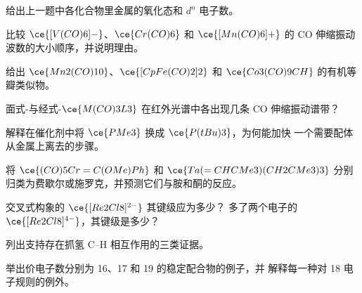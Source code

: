 \begin{exercise}[$\star$]\label{exo:b3:organometallic-bonding:2}
给出上一题中各化合物里金属的氧化态和
$d^n$ 电子数。
\end{exercise}

\begin{exercise}[$\star$]\label{exo:b3:organometallic-bonding:3}
比较 $\ce{[V(CO)6]-}$、$\ce{Cr(CO)6}$ 和 $\ce{[Mn(CO)6]+}$ 的 CO 伸缩振动波数的大小顺序，并说明理由。
\end{exercise}

\begin{exercise}[$\star$]\label{exo:b3:organometallic-bonding:4}
给出 $\ce{Mn2(CO)10}$、$\ce{[CpFe(CO)2]2}$ 和 $\ce{Co3(CO)9CH}$ 的有机等瓣类似物。
\end{exercise}

\begin{exercise}[$\star\star$]\label{exo:b3:organometallic-bonding:5}
面式-与经式-$\ce{M(CO)3L3}$ 在红外光谱中各出现几条 CO 伸缩振动谱带？
\end{exercise}

\begin{exercise}[$\star\star$]\label{exo:b3:organometallic-bonding:6}
解释在催化剂中将 $\ce{PMe3}$ 换成 $\ce{P(tBu)3}$，为何能加快
一个需要配体从金属上离去的步骤。
\end{exercise}

\begin{exercise}[$\star\star$]\label{exo:b3:organometallic-bonding:7}
将 $\ce{(CO)5Cr=C(OMe)Ph}$ 和 $\ce{Ta(=CHCMe3)(CH2CMe3)3}$ 分别归类为费歇尔或施罗克，并预测它们与胺和酮的反应。
\end{exercise}

\begin{exercise}[$\star\star$]\label{exo:b3:organometallic-bonding:8}
交叉式构象的 $\ce{[Re2Cl8]^{2-}}$ 其键级应为多少？
多了两个电子的 $\ce{[Re2Cl8]^{4-}}$，其键级是多少？
\end{exercise}

\begin{exercise}[$\star\star$]\label{exo:b3:organometallic-bonding:9}
列出支持存在抓氢 C--H 相互作用的三类证据。
\end{exercise}

\begin{exercise}[$\star\star\star$]\label{exo:b3:organometallic-bonding:10}
举出价电子数分别为 16、17 和 19 的稳定配合物的例子，并
解释每一种对 18 电子规则的例外。
\end{exercise}


